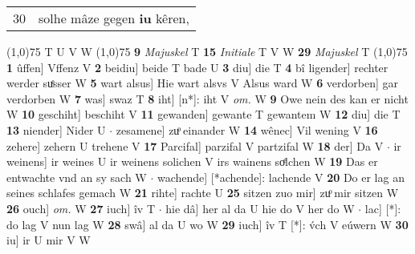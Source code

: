 \documentclass[8pt,a4paper,notitlepage]{article}
\begin{document}
\begin{table}[ht]
\begin{minipage}[t]{0.5\linewidth}
\begin{tabular}{rl}
30 & solhe mâze gegen \textbf{iu} kêren,\\ 
\end{tabular}
\scriptsize
\line(1,0){75} \newline
T U V W \newline
\line(1,0){75} \newline
\textbf{9} \textit{Majuskel} T  \textbf{15} \textit{Initiale} T V W  \textbf{29} \textit{Majuskel} T  \newline
\line(1,0){75} \newline
\textbf{1} ûffen] Vffenz V \textbf{2} beidiu] beide T bade U \textbf{3} diu] die T \textbf{4} bî ligender] rechter werder suͤsser W \textbf{5} wart alsus] Hie wart alsvs V Alsus ward W \textbf{6} verdorben] gar verdorben W \textbf{7} was] swaz T \textbf{8} iht] [n*]: iht V \textit{om.} W \textbf{9} Owe nein des kan er nicht W \textbf{10} geschiht] beschiht V \textbf{11} gewanden] gewante T gewantem W \textbf{12} diu] die T \textbf{13} niender] Nider U  $\cdot$ zesamene] zuͦ einander W \textbf{14} wênec] Vil wening V \textbf{16} zehere] zehern U trehene V \textbf{17} Parcifal] parzifal V partzifal W \textbf{18} der] Da V  $\cdot$ ir weinens] ir weines U ir weinens solichen V irs wainens soͤlchen W \textbf{19} Das er entwachte vnd an sy sach W  $\cdot$ wachende] [*achende]: lachende V \textbf{20} Do er lag an seines schlafes gemach W \textbf{21} rihte] rachte U \textbf{25} sitzen zuo mir] zuͦ mir sitzen W \textbf{26} ouch] \textit{om.} W \textbf{27} iuch] îv T  $\cdot$ hie dâ] her al da U hie do V her do W  $\cdot$ lac] [*]: do lag V nun lag W \textbf{28} swâ] al da U wo W \textbf{29} iuch] îv T [*]: v́ch V eúwern W \textbf{30} iu] ir U mir V W \newline
\end{minipage}
\end{table}
\end{document}
